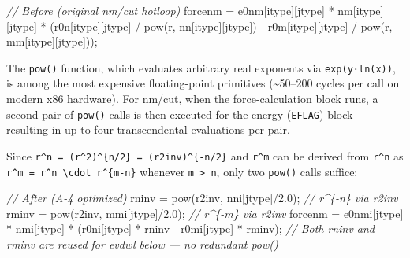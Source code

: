 \documentclass[
  11pt,
]{article}
\newenvironment{Shaded}{}{}
\newcommand{\CommentTok}[1]{\textcolor[rgb]{0.38,0.63,0.69}{\textit{#1}}}
\newcommand{\FloatTok}[1]{\textcolor[rgb]{0.25,0.63,0.44}{#1}}
\newcommand{\NormalTok}[1]{#1}
\newcommand{\OperatorTok}[1]{\textcolor[rgb]{0.40,0.40,0.40}{#1}}
\begin{document}
\begin{Shaded}
\begin{Highlighting}[]
\CommentTok{// Before (original nm/cut hotloop)}
\NormalTok{forcenm }\OperatorTok{=}\NormalTok{ e0nm}\OperatorTok{[}\NormalTok{itype}\OperatorTok{][}\NormalTok{jtype}\OperatorTok{]} \OperatorTok{*}\NormalTok{ nm}\OperatorTok{[}\NormalTok{itype}\OperatorTok{][}\NormalTok{jtype}\OperatorTok{]} \OperatorTok{*}
          \OperatorTok{(}\NormalTok{r0n}\OperatorTok{[}\NormalTok{itype}\OperatorTok{][}\NormalTok{jtype}\OperatorTok{]} \OperatorTok{/}\NormalTok{ pow}\OperatorTok{(}\NormalTok{r}\OperatorTok{,}\NormalTok{ nn}\OperatorTok{[}\NormalTok{itype}\OperatorTok{][}\NormalTok{jtype}\OperatorTok{])}
           \OperatorTok{{-}}\NormalTok{ r0m}\OperatorTok{[}\NormalTok{itype}\OperatorTok{][}\NormalTok{jtype}\OperatorTok{]} \OperatorTok{/}\NormalTok{ pow}\OperatorTok{(}\NormalTok{r}\OperatorTok{,}\NormalTok{ mm}\OperatorTok{[}\NormalTok{itype}\OperatorTok{][}\NormalTok{jtype}\OperatorTok{]));}
\end{Highlighting}
\end{Shaded}

The \texttt{pow()} function, which evaluates arbitrary real exponents
via \texttt{exp(y·ln(x))}, is among the most expensive floating-point
primitives (\textasciitilde50--200 cycles per call on modern x86
hardware). For nm/cut, when the force-calculation block runs, a second
pair of \texttt{pow()} calls is then executed for the energy
(\texttt{EFLAG}) block---resulting in up to four transcendental
evaluations per pair.

Since \texttt{r\^{}n\ =\ (r\^{}2)\^{}\{n/2\}\ =\ (r2inv)\^{}\{-n/2\}}
and \texttt{r\^{}m} can be derived from \texttt{r\^{}n} as
\texttt{r\^{}m\ =\ r\^{}n\ \textbackslash{}cdot\ r\^{}\{m-n\}} whenever
\texttt{m\ \textgreater{}\ n}, only two \texttt{pow()} calls suffice:

\begin{Shaded}
\begin{Highlighting}[]
\CommentTok{// After (A{-}4 optimized)}
\NormalTok{rninv }\OperatorTok{=}\NormalTok{ pow}\OperatorTok{(}\NormalTok{r2inv}\OperatorTok{,}\NormalTok{ nni}\OperatorTok{[}\NormalTok{jtype}\OperatorTok{]/}\FloatTok{2.0}\OperatorTok{);}   \CommentTok{// r\^{}\{{-}n\} via r2inv}
\NormalTok{rminv }\OperatorTok{=}\NormalTok{ pow}\OperatorTok{(}\NormalTok{r2inv}\OperatorTok{,}\NormalTok{ mmi}\OperatorTok{[}\NormalTok{jtype}\OperatorTok{]/}\FloatTok{2.0}\OperatorTok{);}   \CommentTok{// r\^{}\{{-}m\} via r2inv}
\NormalTok{forcenm }\OperatorTok{=}\NormalTok{ e0nmi}\OperatorTok{[}\NormalTok{jtype}\OperatorTok{]} \OperatorTok{*}\NormalTok{ nmi}\OperatorTok{[}\NormalTok{jtype}\OperatorTok{]} \OperatorTok{*}
          \OperatorTok{(}\NormalTok{r0ni}\OperatorTok{[}\NormalTok{jtype}\OperatorTok{]} \OperatorTok{*}\NormalTok{ rninv }\OperatorTok{{-}}\NormalTok{ r0mi}\OperatorTok{[}\NormalTok{jtype}\OperatorTok{]} \OperatorTok{*}\NormalTok{ rminv}\OperatorTok{);}
\CommentTok{// Both rninv and rminv are reused for evdwl below — no redundant pow()}
\end{Highlighting}
\end{Shaded}
\end{document}
